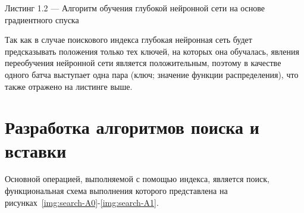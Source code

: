\noindent\parbox[t]{\linewidth}{
Листинг 1.2 --- Алгоритм обучения глубокой нейронной сети на основе
\mbox{градиентного} спуска
}
\vspace{-1cm}
\begin{algorithm}[H]
    \label{alg:sdg}
    \small


\end{algorithm}
\vspace{1.5cm}

Так как в случае поискового индекса глубокая нейронная сеть будет предсказывать
положения только тех ключей, на которых она обучалась, явления переобучения
нейронной сети является положительным, поэтому в качестве одного батча выступает
одна пара (ключ; значение функции распределения), что также отражено на листинге
выше.

\section{Разработка алгоритмов поиска и вставки}
Основной операцией, выполняемой с помощью индекса, является поиск,
функциональная схема выполнения которого представлена на
рисунках~\ref{img:search-A0}-\ref{img:search-A1}.

